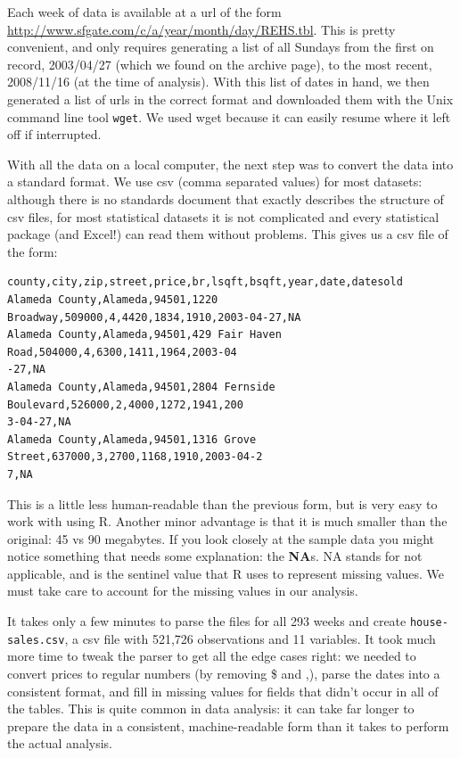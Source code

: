 \documentclass[oneside]{article}
\begin{document}
Each week of data is available at a url of the form \url{http://www.sfgate.com/c/a/year/month/day/REHS.tbl}.  This is pretty convenient, and only requires generating a list of all Sundays from the first on record, 2003/04/27 (which we found on the archive page), to the most recent, 2008/11/16 (at the time of analysis).  With this list of dates in hand, we then generated a list of urls in the correct format and downloaded them with the Unix command line tool {\tt wget}. We used wget because it can easily resume where it left off if interrupted.

With all the data on a local computer, the next step was to convert the data into a standard format.  We use csv (comma separated values) for most datasets: although there is no standards document that exactly describes the structure of csv files, for most statistical datasets it is not complicated and every statistical package (and Excel!) can read them without problems.  This gives us a csv file of the form:

\begin{verbatim}
county,city,zip,street,price,br,lsqft,bsqft,year,date,datesold
Alameda County,Alameda,94501,1220 Broadway,509000,4,4420,1834,1910,2003-04-27,NA
Alameda County,Alameda,94501,429 Fair Haven Road,504000,4,6300,1411,1964,2003-04
-27,NA
Alameda County,Alameda,94501,2804 Fernside Boulevard,526000,2,4000,1272,1941,200
3-04-27,NA
Alameda County,Alameda,94501,1316 Grove Street,637000,3,2700,1168,1910,2003-04-2
7,NA
\end{verbatim}

This is a little less human-readable than the previous form, but is very easy to work with using R.  Another minor advantage is that it is much smaller than the original:  45 vs 90 megabytes.  If you look closely at the sample data you might notice something that needs some explanation: the {\bf NA}s.  NA stands for not applicable, and is the sentinel value that R uses to represent missing values. We must take care to account for the missing values in our analysis.

It takes only a few minutes to parse the files for all 293 weeks and create {\tt house-sales.csv}, a csv file with 521,726 observations and 11 variables.  It took much more time to tweak the parser to get all the edge cases right: we needed to convert prices to regular numbers (by removing \$ and ,), parse the dates into a consistent format, and fill in missing values for fields that didn't occur in all of the tables.  This is quite common in data analysis: it can take far longer to prepare the data in a consistent, machine-readable form than it takes to perform the actual analysis.
\end{document}
